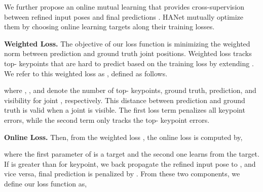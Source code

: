\documentclass[10pt,twocolumn,letterpaper]{article}
\begin{document}
We further propose an online mutual learning that provides cross-supervision between refined input poses  and final predictions . HANet mutually optimize them by choosing online learning targets along their training losses. 

\textbf{Weighted Loss.} The objective of our loss function is minimizing the weighted  norm between prediction and ground truth joint positions. Weighted loss tracks top- keypoints that are hard to predict based on the training loss by extending \cite{ohkm}. We refer to this weighted loss as , defined as follows.

where  , , and  denote the number of top- keypoints, ground truth, prediction, and visibility for joint , respectively. This distance between prediction and ground truth is valid when a joint  is visible. The first loss term penalizes all keypoint errors, while the second term only tracks the top- keypoint errors. 

\textbf{Online Loss.} Then, from the weighted loss , the online loss  is computed by,

where the first parameter of  is a target and the second one learns from the target. If  is greater than  for  keypoint, we back propagate the refined input pose  to , and vice versa, final prediction  is penalized by . From these two components, we define our loss function as,
\end{document}
